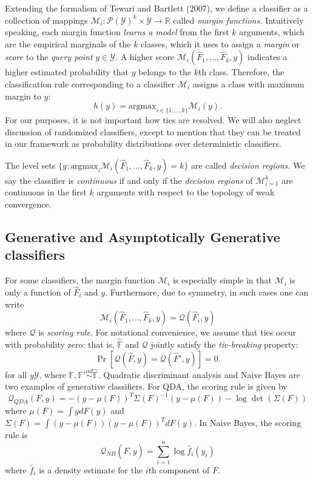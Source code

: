 \documentclass{article}
\newcommand{\argmax}{\text{argmax}}
\begin{document}
Extending the formalism of Tewari and Bartlett (2007), 
we define a classifier as a collection of mappings
$\mathcal{M}_i: \mathcal{P}(\mathcal{Y})^k \times \mathcal{Y} \to \mathbb{R}$ called \emph{margin functions.}
Intuitively speaking, each margin function \emph{learns a model} from the first $k$ arguments, which are
the empirical marginals of the $k$ classes, which it uses to assign a \emph{margin} or \emph{score} to the
\emph{query point} $y \in \mathcal{Y}$.  A higher score $\mathcal{M}_i(\hat{F}_1,\hdots, \hat{F}_k, y)$ indicates a higher estimated probability that $y$ belongs to the $k$th class.  
Therefore, the classification rule corresponding to a classifier $\mathcal{M}_i$ assigns
a class with maximum margin to $y$:
\[
h(y) = \argmax_{i \in \{1,\hdots, k\}} \mathcal{M}_i(y).
\]
For our purposes, it is not important how ties are resolved.  We will also neglect discussion of randomized classifiers,
except to mention that they can be treated in our framework as probability distributions over deterministic classifiers.

The level sets $\{y: \argmax_i \mathcal{M}_i(\hat{F}_1,\hdots, \hat{F}_k, y) = k\}$ are called
\emph{decision regions.}  We say the classifier is \emph{continuous}
if and only if the \emph{decision regions} of $\mathcal{M}_{i=1}^k$ are
continuous in the first $k$ arguments with respect to the topology of
weak convergence.

\subsection{Generative and Asymptotically Generative classifiers}

For some classifiers, the margin function $\mathcal{M}_i$ is especially simple
in that $\mathcal{M}_i$ is only a function of $\hat{F}_i$ and $y$.
Furthermore, due to symmetry, in such cases one can write
\[
\mathcal{M}_i(\hat{F}_1,\hdots, \hat{F}_k, y) = \mathcal{Q}(\hat{F}_i, y)
\]
where $\mathcal{Q}$ is \emph{scoring rule}.
For notational convenience, we assume that ties occur with probability
zero: that is, $\hat{\mathbb{F}}$ and $\mathcal{Q}$ jointly satisfy the
\emph{tie-breaking} property:
\begin{equation}\label{eq:tie}
\Pr[\mathcal{Q}(\hat{F}, y) = \mathcal{Q}(\hat{F}', y)] = 0.
\end{equation}
for all $y \mathcal{Y}$, where $\mathbb{F}, \mathbb{F}' \stackrel{iid}{\sim} \hat{\mathbb{F}}$.
Quadratic discriminant analysis and Naive Bayes are two examples of
generative classifiers.  For QDA, the scoring rule is given by
\[
\mathcal{Q}_{QDA}(F, y) = -(y - \mu(F))^T \Sigma(F)^{-1} (y-\mu(F)) - \log\det(\Sigma(F))
\]
where $\mu(F) = \int y dF(y)$ and $\Sigma(F) = \int (y-\mu(F))(y-\mu(F))^T dF(y)$.
In Naive Bayes, the scoring rule is
\[
\mathcal{Q}_{NB}(\hat{F},  y) = \sum_{i=1}^n \log \hat{f}_i(y_i)
\]
where $\hat{f}_i$ is a density estimate for the $i$th component of
$F$.
\end{document}
